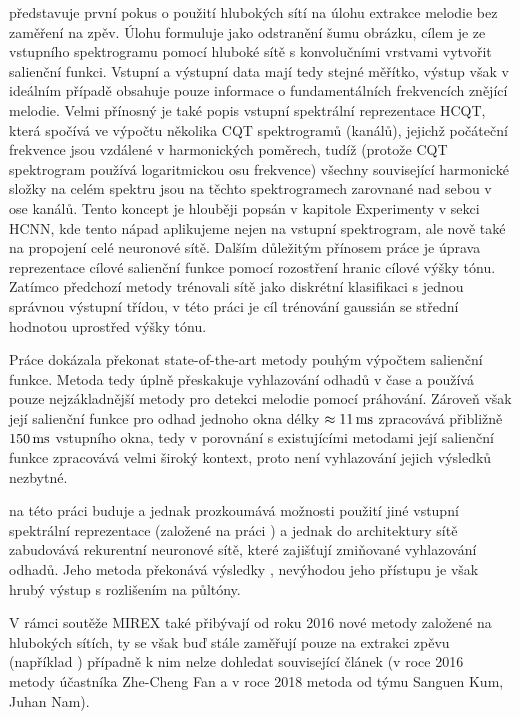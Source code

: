 \cite{Bittner2017} představuje první pokus o použití hlubokých sítí na úlohu extrakce melodie bez zaměření na zpěv. Úlohu formuluje jako odstranění šumu obrázku, cílem je ze vstupního spektrogramu pomocí hluboké sítě s konvolučními vrstvami vytvořit salienční funkci. Vstupní a výstupní data mají tedy stejné měřítko, výstup však v ideálním případě obsahuje pouze informace o fundamentálních frekvencích znějící melodie. Velmi přínosný je také popis vstupní spektrální reprezentace HCQT, která spočívá ve výpočtu několika CQT spektrogramů (kanálů), jejichž počáteční frekvence jsou vzdálené v harmonických poměrech, tudíž (protože CQT spektrogram používá logaritmickou osu frekvence) všechny související harmonické složky na celém spektru jsou na těchto spektrogramech zarovnané nad sebou v ose kanálů. Tento koncept je hlouběji popsán v kapitole Experimenty v sekci HCNN, kde tento nápad aplikujeme nejen na vstupní spektrogram, ale nově také na propojení celé neuronové sítě. Dalším důležitým přínosem práce je úprava reprezentace cílové salienční funkce pomocí rozostření hranic cílové výšky tónu. Zatímco předchozí metody trénovali sítě jako diskrétní klasifikaci s jednou správnou výstupní třídou, v této práci je cíl trénování gaussián se střední hodnotou uprostřed výšky tónu.

Práce \cite{Bittner2017} dokázala překonat state-of-the-art metody pouhým výpočtem salienční funkce. Metoda tedy úplně přeskakuje vyhlazování odhadů v čase a používá pouze nejzákladnější metody pro detekci melodie pomocí práhování. Zároveň však její salienční funkce pro odhad jednoho okna délky $\approx 11\,\rm ms$ zpracovává přibližně $150\,\rm ms$ vstupního okna, tedy v porovnání s existujícími metodami její salienční funkce zpracovává velmi široký kontext, proto není vyhlazování jejich výsledků nezbytné.

\cite{DBasaranSEssid2018} na této práci buduje a jednak prozkoumává možnosti použití jiné vstupní spektrální reprezentace (založené na práci \cite{Durrieu2011a}) a jednak do architektury sítě zabudovává rekurentní neuronové sítě, které zajišťují zmiňované vyhlazování odhadů. Jeho metoda překonává výsledky \cite{Bittner2017}, nevýhodou jeho přístupu je však hrubý výstup s rozlišením na půltóny.

V rámci soutěže MIREX také přibývají od roku 2016 nové metody založené na hlubokých sítích, ty se však buď stále zaměřují pouze na extrakci zpěvu (například \cite{Su2018}) případně k nim nelze dohledat související článek (v roce 2016 metody účastníka Zhe-Cheng Fan a v roce 2018 metoda od týmu Sanguen Kum, Juhan Nam).

